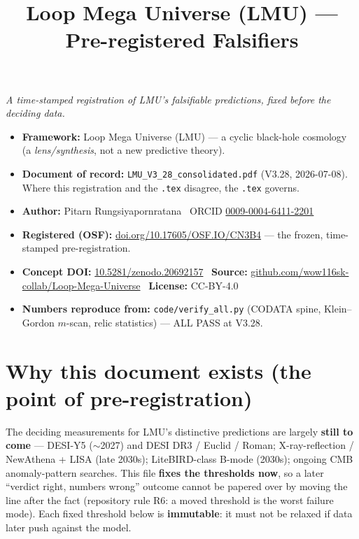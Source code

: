 \documentclass[11pt,a4paper]{article}
\title{\vspace{-1.2cm}\textbf{Loop Mega Universe (LMU) --- Pre-registered Falsifiers}}
\author{}
\date{}
\begin{document}
\maketitle
\vspace{-1.4cm}

\begin{center}\itshape A time-stamped registration of LMU's falsifiable predictions, fixed before the deciding data.\end{center}

\begin{itemize}
\item \textbf{Framework:} Loop Mega Universe (LMU) --- a cyclic black-hole cosmology (a \emph{lens/synthesis}, not a new predictive theory).
\item \textbf{Document of record:} \texttt{LMU\_V3\_28\_consolidated.pdf} (V3.28, 2026-07-08). Where this registration and the \texttt{.tex} disagree, the \texttt{.tex} governs.
\item \textbf{Author:} Pitarn Rungsiyapornratana \textperiodcentered\ ORCID \href{https://orcid.org/0009-0004-6411-2201}{0009-0004-6411-2201}
\item \textbf{Registered (OSF):} \href{https://doi.org/10.17605/OSF.IO/CN3B4}{doi.org/10.17605/OSF.IO/CN3B4} --- the frozen, time-stamped pre-registration.
\item \textbf{Concept DOI:} \href{https://doi.org/10.5281/zenodo.20692157}{10.5281/zenodo.20692157} \textperiodcentered\ \textbf{Source:} \href{https://github.com/wow116sk-collab/Loop-Mega-Universe}{github.com/wow116sk-collab/Loop-Mega-Universe} \textperiodcentered\ \textbf{License:} CC-BY-4.0
\item \textbf{Numbers reproduce from:} \texttt{code/verify\_all.py} (CODATA spine, Klein--Gordon $m$-scan, relic statistics) --- ALL PASS at V3.28.
\end{itemize}

\hrulefill

\section*{Why this document exists (the point of pre-registration)}
The deciding measurements for LMU's distinctive predictions are largely \textbf{still to come} --- DESI-Y5 ($\sim$2027) and DESI DR3 / Euclid / Roman; X-ray-reflection / NewAthena + LISA (late 2030s); LiteBIRD-class B-mode (2030s); ongoing CMB anomaly-pattern searches. This file \textbf{fixes the thresholds now}, so a later ``verdict right, numbers wrong'' outcome cannot be papered over by moving the line after the fact (repository rule R6: a moved threshold is the worst failure mode). Each fixed threshold below is \textbf{immutable}: it must not be relaxed if data later push against the model.
\end{document}
